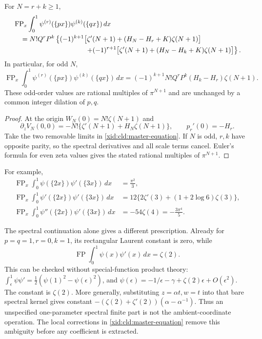 \begin{corollary}
For $N=r+k\ge1$,
\begin{align}
 &\operatorname{FP}_x\int_0^1
      \psi^{(r)}(\{px\})\psi^{(k)}(\{qx\})\,dx\notag\\
 &\quad=N!Q^rP^k\left\{
 (-1)^{k+1}\bigl[\zeta'(N+1)+(H_N-H_r+K)\zeta(N+1)\bigr]\right.\notag\\
 &\hspace{37mm}\left.
 +(-1)^{r+1}\bigl[\zeta'(N+1)+(H_N-H_k+K)\zeta(N+1)\bigr]
                         \right\}.
 \label{xid:cld:polygamma}
\end{align}
In particular, for odd $N$,
\begin{equation}
 \operatorname{FP}_x\int_0^1
      \psi^{(r)}(\{px\})\psi^{(k)}(\{qx\})\,dx
 =(-1)^{k+1}N!Q^rP^k(H_k-H_r)\zeta(N+1).
 \label{xid:cld:odd-parity}
\end{equation}
These odd-order values are rational multiples of $\pi^{N+1}$ and are
unchanged by a common integer dilation of $p,q$.
\end{corollary}
\begin{proof}
At the origin $W_N(0)=N!\zeta(N+1)$ and
\[
 \partial_z V_N(0,0)
 =-N!\{\zeta'(N+1)+H_N\zeta(N+1)\},
 \qquad p_r'(0)=-H_r.
\]
Take the two removable limits in \eqref{xid:cld:master-equation}.
If $N$ is odd, $r,k$ have opposite parity, so the spectral derivatives
and all scale terms cancel.  Euler's formula for even zeta values
gives the stated rational multiples of $\pi^{N+1}$.
\end{proof}

For example,
\begin{align}
 \operatorname{FP}_x\int_0^1\psi(\{2x\})\psi'(\{3x\})\,dx
      &=\frac{\pi^2}{3},\\
 \operatorname{FP}_x\int_0^1\psi'(\{2x\})\psi'(\{3x\})\,dx
      &=12\{2\zeta'(3)+(1+2\log6)\zeta(3)\},\\
 \operatorname{FP}_x\int_0^1\psi''(\{2x\})\psi'(\{3x\})\,dx
      &=-54\zeta(4)=-\frac{3\pi^4}{5}.
 \label{xid:cld:examples}
\end{align}

The spectral continuation alone gives a different prescription.  Already
for $p=q=1,r=0,k=1$, its rectangular Laurent constant is zero, while
\[
 \operatorname{FP}\int_0^1\psi(x)\psi'(x)\,dx=\zeta(2).
\]
This can be checked without special-function product theory:
$\int_\epsilon^1\psi\psi'=\tfrac12(\psi(1)^2-\psi(\epsilon)^2)$,
and $\psi(\epsilon)=-1/\epsilon-\gamma+\zeta(2)\epsilon+O(\epsilon^2)$.
The constant is $\zeta(2)$.
More generally, substituting $z=\alpha t,w=t$ into that bare spectral
kernel gives constant
$-(\zeta(2)+\zeta'(2))(\alpha-\alpha^{-1})$.
Thus an unspecified one-parameter spectral finite part is not the
ambient-coordinate operation.  The local corrections in
\eqref{xid:cld:master-equation} remove this ambiguity before any coefficient
is extracted.


